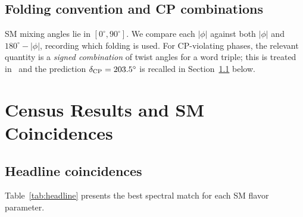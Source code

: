 \documentclass[a4paper,11pt]{article}
\newcommand{\degr}{^{\circ}}
\begin{document}
\subsection{Folding convention and CP combinations}

SM mixing angles lie in $[0\degr,90\degr]$.
We compare each $|\phi|$ against both $|\phi|$ and $180\degr-|\phi|$,
recording which folding is used.
For CP-violating phases, the relevant quantity is a \emph{signed combination}
of twist angles for a word triple; this is treated in~\cite{GentryCP} and
the prediction $\delta_{\rm CP}=203.5\degr$ is recalled in
Section~\ref{sec:headline} below.

\section{Census Results and SM Coincidences}
\label{sec:results}

\subsection{Headline coincidences}
\label{sec:headline}

Table~\ref{tab:headline} presents the best spectral match for each SM flavor
parameter.
\end{document}
